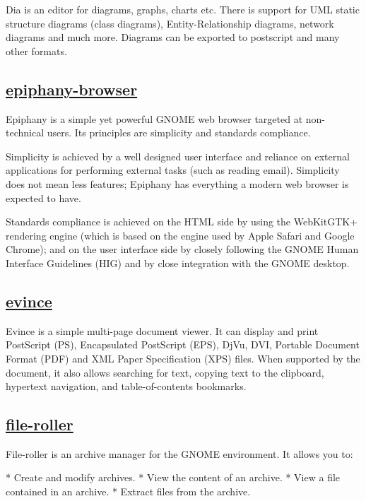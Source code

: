  Dia is an editor for diagrams, graphs, charts etc. There is support for UML
 static structure diagrams (class diagrams), Entity-Relationship diagrams,
 network diagrams and much more. Diagrams can be exported to postscript and
 many other formats.

\subsection{\href{https://wiki.gnome.org/Apps/Web}{epiphany-browser}}

 Epiphany is a simple yet powerful GNOME web browser targeted at
 non-technical users. Its principles are simplicity and standards
 compliance.
 
 Simplicity is achieved by a well designed user interface and reliance
 on external applications for performing external tasks (such as reading
 email). Simplicity does not mean less features; Epiphany has everything
 a modern web browser is expected to have.
 
 Standards compliance is achieved on the HTML side by using the
 WebKitGTK+ rendering engine (which is based on the engine used by
 Apple Safari and Google Chrome); and on the user interface side by
 closely following the GNOME Human Interface Guidelines (HIG) and by
 close integration with the GNOME desktop.

\subsection{\href{https://wiki.gnome.org/Apps/Evince}{evince}}

 Evince is a simple multi-page document viewer.  It can display and print
 PostScript (PS), Encapsulated PostScript (EPS), DjVu, DVI, Portable
 Document Format (PDF) and XML Paper Specification (XPS) files.
 When supported by the document, it also allows searching for text,
 copying text to the clipboard, hypertext navigation, and
 table-of-contents bookmarks.

\subsection{\href{http://fileroller.sourceforge.net/}{file-roller}}

 File-roller is an archive manager for the GNOME environment. It allows you to:
 
  * Create and modify archives.
  * View the content of an archive.
  * View a file contained in an archive.
  * Extract files from the archive.
 
